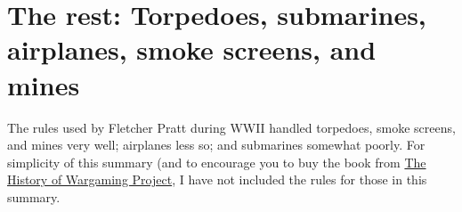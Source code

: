 \documentclass[twocolumn]{article}
\begin{document}
\section*{The rest: Torpedoes, submarines, airplanes, smoke screens, and mines}

The rules used by Fletcher Pratt during WWII handled torpedoes, smoke
screens, and mines very well; airplanes less so; and submarines somewhat
poorly. For simplicity of this summary (and to encourage you to buy the
book from
\href{http://www.wargaming.co/recreation/details/fpnaval.htm}{The History of Wargaming Project},
I have not included the rules for those in this summary.

\end{document}
